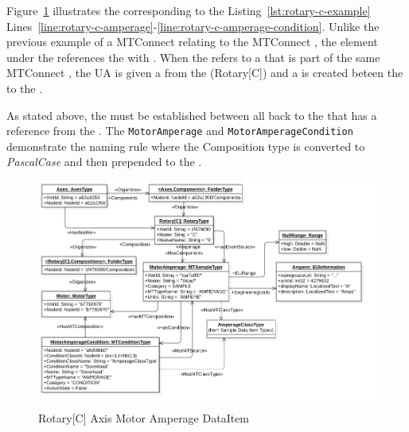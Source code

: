 \FloatBarrier

Figure~\ref{fig:rotary-c-amperage} illustrates the   corresponding to the Listing~\ref{lst:rotary-c-example} Lines~\ref{line:rotary-c-amperage}-\ref{line:rotary-c-amperage-condition}. Unlike the previous example of a MTConnect  relating to the MTConnect , the  element under the  references the  with  . When the  refers to a  that is part of the same MTConnect , the UA  is given a   from the  (Rotary[C]) and a   is created beteen the  to the .

As stated above, the   must be established between all  back to the  that has a reference from the . The \texttt{MotorAmperage} and \texttt{MotorAmperageCondition} demonstrate the naming rule where the Composition type is converted to \textit{PascalCase} and then prepended to the  . 

\begin{figure}[ht]
    \centering
    \includegraphics[width=1.0\textwidth]{diagrams/mtconnect-mapping/rotary-c-amperage.png}
    \caption{Rotary[C] Axis Motor Amperage DataItem}
    \label{fig:rotary-c-amperage}
\end{figure}

\FloatBarrier


